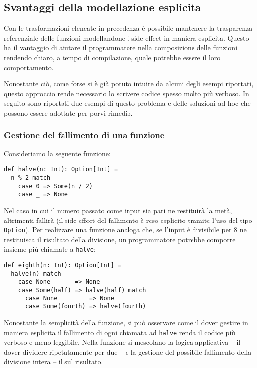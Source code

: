 \subsection{Svantaggi della modellazione esplicita}
\label{svantaggi-della-modellazione-esplicita}
Con le trasformazioni elencate in precedenza è possibile mantenere la trasparenza referenziale delle funzioni modellandone i side effect in maniera esplicita. Questo ha il vantaggio di aiutare il programmatore nella composizione delle funzioni rendendo chiaro, a tempo di compilazione, quale potrebbe essere il loro comportamento.

Nonostante ciò, come forse si è già potuto intuire da alcuni degli esempi riportati, questo approccio rende necessario lo scrivere codice spesso molto più verboso.
In seguito sono riportati due esempi di questo problema e delle soluzioni ad hoc che possono essere adottate per porvi rimedio.

\subsubsection{Gestione del fallimento di una funzione}
Consideriamo la seguente funzione:
\begin{lstlisting}[language=scala3]
def halve(n: Int): Option[Int] =
  n % 2 match
    case 0 => Some(n / 2)
    case _ => None 
\end{lstlisting}
Nel caso in cui il numero passato come input sia pari ne restituirà la metà, altrimenti fallirà (il side effect del fallimento è reso esplicito tramite l'uso del tipo \lstinline{Option}). Per realizzare una funzione analoga che, se l'input è divisibile per 8 ne restituisca il risultato della divisione, un programmatore potrebbe comporre insieme   più chiamate a \lstinline{halve}:
\begin{lstlisting}[language=scala3]
def eighth(n: Int): Option[Int] =
  halve(n) match
    case None       => None
    case Some(half) => halve(half) match
      case None         => None
      case Some(fourth) => halve(fourth)
\end{lstlisting}
Nonostante la semplicità della funzione, si può osservare come il dover gestire in maniera esplicita il fallimento di ogni chiamata ad \lstinline{halve} renda il codice più verboso e meno leggibile. Nella funzione si mescolano la logica applicativa -- il dover dividere ripetutamente per due -- e la gestione del possibile fallimento della divisione intera -- il  sul risultato.

